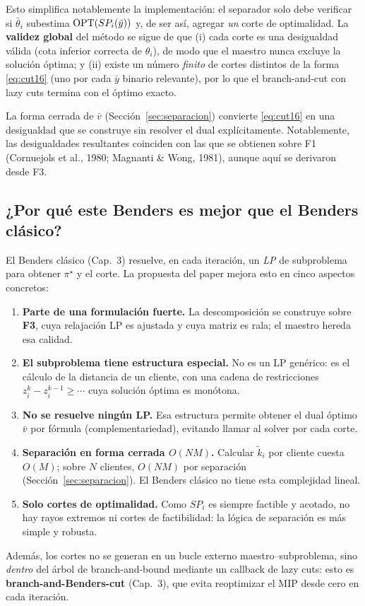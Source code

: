 Esto simplifica notablemente la implementación: el separador solo debe verificar si
$\bar\theta_i$ subestima $\mathrm{OPT}(SP_i(\bar y))$ y, de ser así, agregar \emph{un} corte de
optimalidad. La \textbf{validez global} del método se sigue de que (i) cada corte es una
desigualdad válida (cota inferior correcta de $\theta_i$), de modo que el maestro nunca excluye la
solución óptima; y (ii) existe un número \emph{finito} de cortes distintos de la forma
\eqref{eq:cut16} (uno por cada $\bar y$ binario relevante), por lo que el branch-and-cut con
lazy cuts termina con el óptimo exacto.

\medskip
La forma cerrada de $\bar v$ (Sección~\ref{sec:separacion}) convierte \eqref{eq:cut16} en una
desigualdad que se construye sin resolver el dual explícitamente. Notablemente, las
desigualdades resultantes coinciden con las que se obtienen sobre F1 (Cornuejols et al., 1980;
Magnanti \& Wong, 1981), aunque aquí se derivaron desde F3.

\subsection{¿Por qué este Benders es mejor que el Benders clásico?}
\label{sub:porque-mejor}
El Benders clásico (Cap.~3) resuelve, en cada iteración, un \emph{LP} de subproblema para obtener
$\pi^\star$ y el corte. La propuesta del paper mejora esto en cinco aspectos concretos:
\begin{enumerate}[leftmargin=1.6em]
  \item \textbf{Parte de una formulación fuerte.} La descomposición se construye sobre \textbf{F3},
        cuya relajación LP es ajustada y cuya matriz es rala; el maestro hereda esa calidad.
  \item \textbf{El subproblema tiene estructura especial.} No es un LP genérico: es el cálculo de
        la distancia de un cliente, con una cadena de restricciones $z^k_i-z^{k-1}_i\ge\cdots$
        cuya solución óptima es monótona.
  \item \textbf{No se resuelve ningún LP.} Esa estructura permite obtener el dual óptimo
        $\bar v$ por fórmula (complementariedad), evitando llamar al solver por cada corte.
  \item \textbf{Separación en forma cerrada $O(NM)$.} Calcular $\tilde k_i$ por cliente cuesta
        $O(M)$; sobre $N$ clientes, $O(NM)$ por separación
        (Sección~\ref{sec:separacion}). El Benders clásico no tiene esta complejidad lineal.
  \item \textbf{Solo cortes de optimalidad.} Como $SP_i$ es siempre factible y acotado, no hay
        rayos extremos ni cortes de factibilidad: la lógica de separación es más simple y robusta.
\end{enumerate}
Además, los cortes no se generan en un bucle externo maestro--subproblema, sino \emph{dentro} del
árbol de branch-and-bound mediante un callback de lazy cuts: esto es
\textbf{branch-and-Benders-cut} (Cap.~3), que evita reoptimizar el MIP desde cero en cada
iteración.
